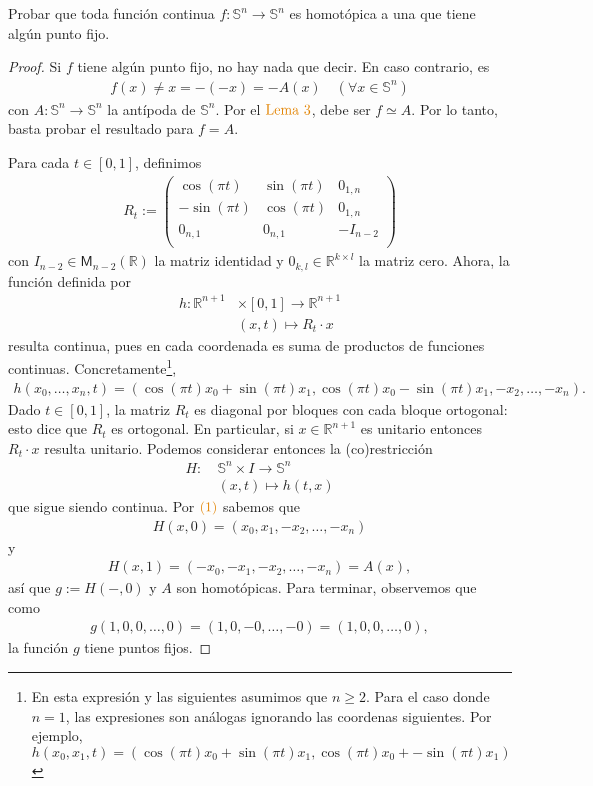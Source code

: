 \documentclass[11pt]{article}
\newcommand{\R}{\mathbb{R}}
\newcommand{\Ss}{\mathbb{S}}
\newcommand{\paint}[2]{\color{#1}{#2}}
\newenvironment{exercise}[2][Ejercicio]{\begin{trivlist}
\item[\hskip \labelsep \paint{orange}{{\bfseries #1}}\hskip \labelsep {\bfseries #2.}]}{\end{trivlist}}
\begin{document}
\begin{exercise}{10} Probar que toda funci\'on continua $f : \Ss^n \to \Ss^n$ es homot\'opica a una que tiene alg\'un punto fijo.
\end{exercise}
\begin{proof} Si $f$ tiene alg\'un punto fijo, no hay nada que decir. En caso contrario, es
\begin{align*}
f(x) \neq x = -(-x) = -A(x) \quad  (\forall x \in \Ss^n)
\end{align*}
con $A : \Ss^n \to \Ss^n$ la ant\'ipoda de $\Ss^n$. Por el $\paint{orange}{\text{Lema $3$}}$, debe ser $f \simeq A$. Por lo tanto, basta probar el resultado para $f = A$. 

Para cada $t \in [0,1]$, definimos
\begin{align*}
R_t := \begin{pmatrix}
\cos(\pi t) & \sin(\pi t) & 0_{1,n}\\
-\sin(\pi t) & \cos(\pi t) & 0_{1,n}\\
0_{n,1} & 0_{n,1} & -I_{n-2}\\
\end{pmatrix}
\end{align*}
con $I_{n-2} \in \mathsf{M}_{n-2}(\R)$ la matriz identidad y $0_{k,l} \in \R^{k \times l}$ la matriz cero. Ahora, la funci\'on definida por
\begin{align*}
h : \R^{n+1}& \times [0,1] \to \mathbb{R}^{n+1}\\
&(x,t) \longmapsto R_t \cdot x
\end{align*}
resulta continua, pues en cada coordenada es suma de productos de funciones continuas. Concretamente\footnote{En esta expresi\'on y las siguientes asumimos que $n \geq 2$. Para el caso donde $n = 1$, las expresiones son an\'alogas ignorando las coordenas siguientes. Por ejemplo, $h(x_0,x_1,t) = (\cos(\pi t)x_0 + \sin(\pi t)x_1,\cos(\pi t)x_0+-\sin(\pi t)x_1)$}, 
\begin{align}
h(x_0,\dots,x_n,t) = (\cos(\pi t)x_0 + \sin(\pi t)x_1,\cos(\pi t)x_0-\sin(\pi t)x_1,-x_2, \dots,-x_n).
\end{align}
Dado $t \in [0,1]$, la matriz $R_t$ es diagonal por bloques con cada bloque ortogonal: esto dice que $R_t$ es ortogonal. En particular, si $x \in \R^{n+1}$ es unitario entonces $R_t \cdot x$ resulta unitario. Podemos considerar entonces la (co)restricci\'on 
\begin{align*}
H : \ &\Ss^n \times I \to \Ss^n\\
&(x,t) \longmapsto h(t,x)
\end{align*}
que sigue siendo continua. Por $\paint{orange}{(1)}$ sabemos que
\begin{align*}
H(x,0) = (x_0,x_1,-x_2,\dots,-x_n)
\end{align*}
y
\begin{align*}
H(x,1) = (-x_0,-x_1,-x_2,\dots,-x_n) = A(x),
\end{align*}
as\'i que $g := H(-,0)$ y $A$ son homot\'opicas. Para terminar, observemos que como
\begin{align*}
g(1,0,0,\dots,0) = (1,0,-0,\dots,-0) = (1,0,0,\dots,0),
\end{align*}
la funci\'on $g$ tiene puntos fijos.
\end{proof}
\end{document}
